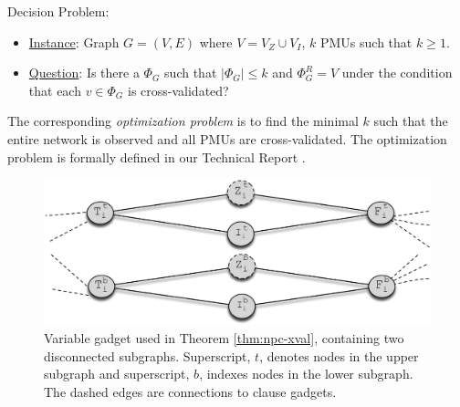 \xval Decision Problem:
\begin{itemize}
	\item \underline{Instance}: Graph $G=(V,E)$ where $V=V_Z \cup V_I$, $k$ PMUs such that $k \geq 1$.

	\item \underline{Question}: Is there a $\Phi_G$ such that $|\Phi_G| \leq k$ and $\Phi^R_G = V$ under the condition that each $v \in \Phi_G$ is cross-validated?
\end{itemize}

The corresponding {\em optimization problem} is to find the minimal $k$ such that the entire network is observed and all PMUs are cross-validated. 
The optimization problem is formally defined in our Technical Report \cite{Tech12}.

\begin{figure}[t]
\centering
\includegraphics[scale=0.46]{figs/vgadget-inject.pdf}
\caption{Variable gadget used in Theorem \ref{thm:npc-xval}, containing two disconnected subgraphs. Superscript, $t$, denotes nodes in the upper subgraph and 
superscript, $b$, indexes nodes in the lower subgraph. The dashed edges are connections to clause gadgets.}
\label{fig:xval-gadget}
\end{figure}

